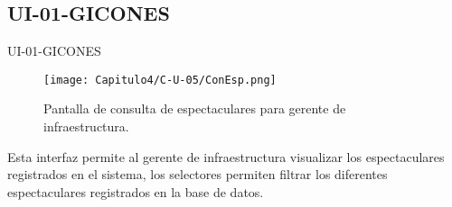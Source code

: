 \subsection{UI-01-GICONES}
\hypertarget{UI:UI-01-GICONES}{UI-01-GICONES}
\begin{figure}[htbp!]
    \centering
    \texttt{[image: Capitulo4/C-U-05/ConEsp.png]}
    \caption{Pantalla de consulta de espectaculares para gerente de infraestructura.}
    \label{fig:my_label}
\end{figure}
Esta interfaz permite al gerente de infraestructura visualizar los espectaculares registrados en el sistema, los selectores permiten filtrar los diferentes espectaculares registrados en la base de datos.
\clearpage